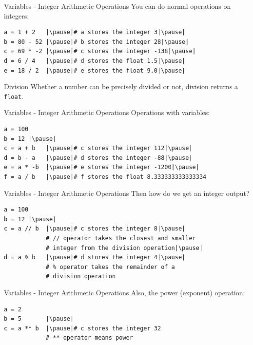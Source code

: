 \documentclass[dvipsnames, svgnames, x11names]{beamer}
\begin{document}
\begin{frame}[fragile]{Variables - Integer Arithmetic Operations}
You can do normal operations on integers:
\begin{verbatim}
a = 1 + 2   |\pause|# a stores the integer 3|\pause|
b = 80 - 52 |\pause|# b stores the integer 28|\pause|
c = 69 * -2 |\pause|# c stores the integer -138|\pause|
d = 6 / 4   |\pause|# d stores the float 1.5|\pause|
e = 18 / 2  |\pause|# e stores the float 9.0|\pause|
\end{verbatim}
\begin{alertblock}{Division}
Whether a number can be precisely divided or not, division returns a \texttt{float}.
\end{alertblock}
\end{frame}

\begin{frame}[fragile]{Variables - Integer Arithmetic Operations}
Operations with variables:
\begin{verbatim}
a = 100
b = 12 |\pause|
c = a + b   |\pause|# c stores the integer 112|\pause|
d = b - a   |\pause|# d stores the integer -88|\pause|
e = a * -b  |\pause|# e stores the integer -1200|\pause|
f = a / b   |\pause|# f stores the float 8.333333333333334
\end{verbatim}
\end{frame}

\begin{frame}[fragile]{Variables - Integer Arithmetic Operations}
Then how do we get an integer output?\pause
\begin{verbatim}
a = 100
b = 12 |\pause|
c = a // b  |\pause|# c stores the integer 8|\pause|
            # // operator takes the closest and smaller 
            # integer from the division operation|\pause|
d = a % b   |\pause|# d stores the integer 4|\pause|
			# % operator takes the remainder of a 
			# division operation
\end{verbatim}
\end{frame}

\begin{frame}[fragile]{Variables - Integer Arithmetic Operations}
Also, the power (exponent) operation:
\begin{verbatim}
a = 2
b = 5       |\pause|
c = a ** b  |\pause|# c stores the integer 32
			# ** operator means power
\end{verbatim}
\end{frame}
 
\end{document}
